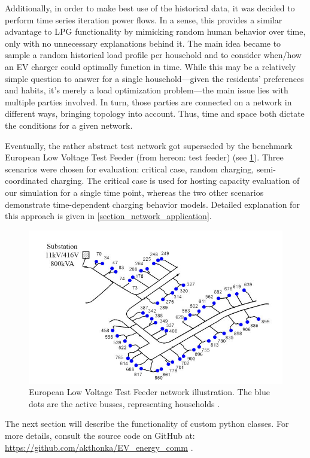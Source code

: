 \documentclass[a4paper,10pt]{report}
\begin{document}
Additionally, in order to make best use of the historical data, it was decided to perform time series iteration power flows. In a sense, this provides a similar advantage to LPG functionality by mimicking random human behavior over time, only with no unnecessary explanations behind it. The main idea became to sample a random historical load profile per household and to consider when/how an EV charger could optimally function in time. While this may be a relatively simple question to answer for a single household---given the residents' preferences and habits, it's merely a load optimization problem---the main issue lies with multiple parties involved. In turn, those parties are connected on a network in different ways, bringing topology into account. Thus, time and space both dictate the conditions for a given network.

Eventually, the rather abstract test network got superseded by the benchmark European Low Voltage Test Feeder (from hereon: test feeder) (see \cref{EU_LV_test_feeder}). Three scenarios were chosen for evaluation: critical case, random charging, semi-coordinated charging. The critical case is used for hosting capacity evaluation of our simulation for a single time point, whereas the two other scenarios demonstrate time-dependent charging behavior models. Detailed explanation for this approach is given in \cref{section_network_application}.

\FloatBarrier
\begin{figure}[htpb]
	\centering
	\includegraphics[width=0.7\linewidth]{EU_LV_test_feeder}
	\caption{European Low Voltage Test Feeder network illustration. The blue dots are the active busses, representing households \cite{Nousdilis2017}.}
	\label{EU_LV_test_feeder}
\end{figure}
\FloatBarrier

The next section will describe the functionality of custom python classes. For more details, consult the source code on GitHub at: \url{https://github.com/akthonka/EV_energy_comm} .
\end{document}
